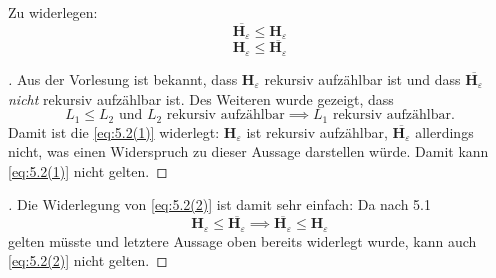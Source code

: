 Zu widerlegen:
\begin{equation}\label{eq:5.2(1)}
	\overline{\mathbf{H}_\varepsilon} \leq \mathbf{H}_\varepsilon
\end{equation}
\begin{equation}\label{eq:5.2(2)}
	\mathbf{H}_\varepsilon \leq \overline{\mathbf{H}_\varepsilon}
\end{equation}
\begin{proof}[\unskip\nopunct]
Aus der Vorlesung ist bekannt, dass $\mathbf{H}_\varepsilon$ rekursiv aufzählbar
ist und dass $\overline{\mathbf{H}_\varepsilon}$ \textit{nicht} rekursiv
aufzählbar ist. Des Weiteren wurde gezeigt, dass
\[
	L_1 \leq L_2 \text{ und } L_2 \text{ rekursiv aufzählbar} \implies L_1
	\text{ rekursiv aufzählbar.}
\]
Damit ist die \eqref{eq:5.2(1)} widerlegt: $\textbf{H}_\varepsilon$ ist rekursiv
aufzählbar, $\overline{\textbf{H}_\varepsilon}$ allerdings nicht, was einen
Widerspruch zu dieser Aussage darstellen würde. Damit kann \eqref{eq:5.2(1)}
nicht gelten.
\end{proof}

\begin{proof}[\unskip\nopunct]
Die Widerlegung von \eqref{eq:5.2(2)} ist damit sehr einfach: Da nach 5.1
\[
	\mathbf{H}_\varepsilon \leq \overline{\mathbf{H}_\varepsilon} \implies
	\overline{\mathbf{H}_\varepsilon} \leq \mathbf{H}_\varepsilon
\]
gelten müsste und letztere Aussage oben bereits widerlegt wurde, kann auch
\eqref{eq:5.2(2)} nicht gelten.
\end{proof}

